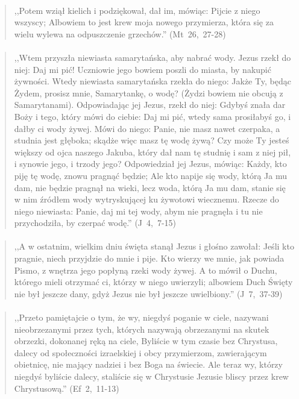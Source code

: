 \documentclass[10pt,a4paper,oneside]{article}
\begin{document}
\paragraph{}
\begin{quote}
,,Potem wziął kielich i podziękował, dał im, mówiąc: Pijcie z niego wszyscy; Albowiem to jest krew moja nowego przymierza, która się za wielu wylewa na odpuszczenie grzechów.'' \mbox{(Mt 26, 27-28)}
\end{quote}
\paragraph{}
\begin{quote}
,,Wtem przyszła niewiasta samarytańska, aby nabrać wody. Jezus rzekł do niej: Daj mi pić! Uczniowie jego bowiem poszli do miasta, by nakupić żywności. Wtedy niewiasta samarytańska rzekła do niego: Jakże Ty, będąc Żydem, prosisz mnie, Samarytankę, o wodę? (Żydzi bowiem nie obcują z Samarytanami). Odpowiadając jej Jezus, rzekł do niej: Gdybyś znała dar Boży i tego, który mówi do ciebie: Daj mi pić, wtedy sama prosiłabyś go, i dałby ci wody żywej. Mówi do niego: Panie, nie masz nawet czerpaka, a studnia jest głęboka; skądże więc masz tę wodę żywą? Czy może Ty jesteś większy od ojca naszego Jakuba, który dał nam tę studnię i sam z niej pił, i synowie jego, i trzody jego? Odpowiedział jej Jezus, mówiąc: Każdy, kto piję tę wodę, znowu pragnąć będzie; Ale kto napije się wody, którą Ja mu dam, nie będzie pragnął na wieki, lecz woda, którą Ja mu dam, stanie się w nim źródłem wody wytryskującej ku żywotowi wiecznemu. Rzecze do niego niewiasta: Panie, daj mi tej wody, abym nie pragnęła i tu nie przychodziła, by czerpać wodę.'' \mbox{(J 4, 7-15)}
\end{quote}
\paragraph{}
\begin{quote}
,,A w ostatnim, wielkim dniu święta stanął Jezus i głośno zawołał: Jeśli kto pragnie, niech przyjdzie do mnie i pije. Kto wierzy we mnie, jak powiada Pismo, z wnętrza jego popłyną rzeki wody żywej. A to mówił o Duchu, którego mieli otrzymać ci, którzy w niego uwierzyli; albowiem Duch Święty nie był jeszcze dany, gdyż Jezus nie był jeszcze uwielbiony.'' \mbox{(J 7, 37-39)}
\end{quote}
\paragraph{}
\begin{quote}
,,Przeto pamiętajcie o tym, że wy, niegdyś poganie w ciele, nazywani nieobrzezanymi przez tych, których nazywają obrzezanymi na skutek obrzezki, dokonanej ręką na ciele, Byliście w tym czasie bez Chrystusa, dalecy od społeczności izraelskiej i obcy przymierzom, zawierającym obietnicę, nie mający nadziei i bez Boga na świecie. Ale teraz wy, którzy niegdyś byliście dalecy, staliście się w Chrystusie Jezusie bliscy przez krew Chrystusową.'' \mbox{(Ef 2, 11-13)}
\end{quote}
\end{document}
